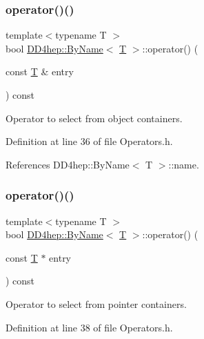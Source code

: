 \subsubsection{\texorpdfstring{operator()()}{operator()()}\hspace{0.1cm}{\footnotesize\ttfamily [1/2]}}
{\footnotesize\ttfamily template$<$typename T $>$ \\
bool \hyperlink{class_d_d4hep_1_1_by_name}{D\+D4hep\+::\+By\+Name}$<$ \hyperlink{class_t}{T} $>$\+::operator() (\begin{DoxyParamCaption}\item[{const \hyperlink{class_t}{T} \&}]{entry }\end{DoxyParamCaption}) const\hspace{0.3cm}{\ttfamily [inline]}}



Operator to select from object containers. 



Definition at line 36 of file Operators.\+h.



References D\+D4hep\+::\+By\+Name$<$ T $>$\+::name.

\hypertarget{class_d_d4hep_1_1_by_name_a8973c4e23c796c168a01fb167368bc1c}{}\label{class_d_d4hep_1_1_by_name_a8973c4e23c796c168a01fb167368bc1c} 
\subsubsection{\texorpdfstring{operator()()}{operator()()}\hspace{0.1cm}{\footnotesize\ttfamily [2/2]}}
{\footnotesize\ttfamily template$<$typename T $>$ \\
bool \hyperlink{class_d_d4hep_1_1_by_name}{D\+D4hep\+::\+By\+Name}$<$ \hyperlink{class_t}{T} $>$\+::operator() (\begin{DoxyParamCaption}\item[{const \hyperlink{class_t}{T} $\ast$}]{entry }\end{DoxyParamCaption}) const\hspace{0.3cm}{\ttfamily [inline]}}



Operator to select from pointer containers. 



Definition at line 38 of file Operators.\+h.



